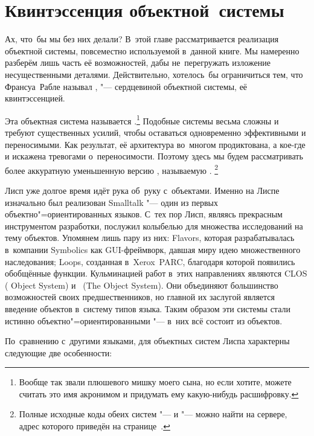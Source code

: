 \chapter{Квинтэссенция объектной~системы}\label{chapter:objects}

 Ах, что~бы мы без них делали? В~этой
главе рассматривается реализация объектной системы, повсеместно используемой
в~данной книге. Мы намеренно разберём лишь часть её возможностей, дабы
не~перегружать изложение несущественными деталями. Действительно, хотелось~бы
ограничиться тем, что Франсуа~Рабле называл , "---
сердцевиной объектной системы, её квинтэссенцией.

Эта объектная система называется {\Meroon}.\footnote*{Вообще так звали
плюшевого мишку моего сына, но если хотите, можете считать это имя акронимом и
придумать ему какую-нибудь расшифровку.} Подобные системы весьма сложны и
требуют существенных усилий, чтобы оставаться одновременно эффективными и
переносимыми. Как результат, её архитектура во~многом продиктована, а кое-где и
искажена тревогами о~переносимости. Поэтому здесь мы будем рассматривать более
аккуратную уменьшенную версию {\Meroon}, называемую {\Meroonet}.%
\footnote*{Полные исходные коды обеих систем "--- {\Meroon} и {\Meroonet} "---
можно найти на сервере, адрес которого приведён на
странице~\pageref{pref/sect:source}.}

\bigskip

Лисп уже долгое время идёт рука об~руку с~объектами. Именно на Лиспе изначально
был реализован Smalltalk "--- один из первых объектно"=ориентированных языков.
С~тех пор Лисп, являясь прекрасным инструментом разработки, послужил колыбелью
для множества исследований на тему объектов. Упомянем лишь пару из них: Flavors,
которая разрабатывалась в~компании Symbolics как GUI-фреймворк, давшая миру идею
множественного наследования; Loops, созданная в~Xerox~PARC, благодаря которой
появились обобщённые функции. Кульминацией работ в~этих направлениях являются
CLOS ({\CommonLisp} Object System) и~{\TELOS} (The {\EuLisp} Object System). Они
объединяют большинство возможностей своих предшественников, но главной их
заслугой является введение объектов в~систему типов языка. Таким образом эти
системы стали истинно объектно"=ориентированными "--- в~них всё состоит из
объектов.

По~сравнению с~другими языками, для объектных систем Лиспа характерны следующие
две особенности:

